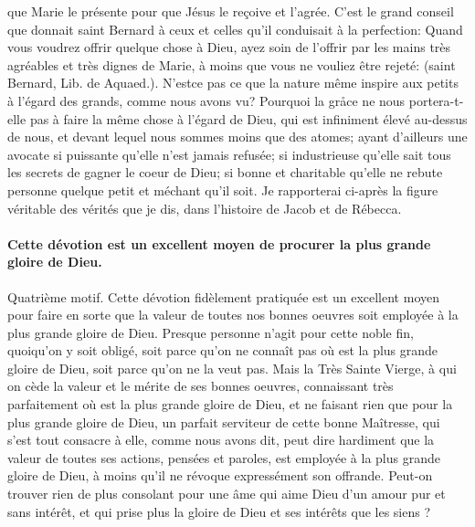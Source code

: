 que Marie le présente pour que Jésus le reçoive et l'agrée. C'est le grand conseil que donnait saint Bernard à ceux
et celles qu'il conduisait à la perfection: Quand vous voudrez offrir quelque chose à Dieu, ayez soin de l'offrir par
les mains très agréables et très dignes de Marie, à moins que vous ne vouliez être rejeté:  (saint Bernard, Lib. de
Aquaed.).
 N'estce pas ce que la nature même inspire aux petits à l'égard des grands, comme nous avons vu? Pourquoi
la gråce ne nous portera-t-elle pas à faire la même chose à l'égard de Dieu, qui est infiniment élevé au-dessus de
nous, et devant lequel nous sommes moins que des atomes; ayant d'ailleurs une avocate si puissante qu'elle n'est
jamais refusée; si industrieuse qu'elle sait tous les secrets de gagner le coeur de Dieu; si bonne et charitable
qu'elle ne rebute personne quelque petit et méchant qu'il soit. Je rapporterai ci-après la figure véritable des vérités
que je dis, dans l'histoire de Jacob et de Rébecca.
\paragraph{Cette dévotion est un excellent moyen de procurer la plus grande gloire de Dieu.}
 Quatrième motif. Cette dévotion fidèlement pratiquée est un excellent moyen pour faire en sorte que la valeur
de toutes nos bonnes oeuvres soit employée à la plus grande gloire de Dieu. Presque personne n'agit pour cette
noble fin, quoiqu'on y soit obligé, soit parce qu'on ne connaît pas où est la plus grande gloire de Dieu, soit parce
qu'on ne la veut pas. Mais la Très Sainte Vierge, à qui on cède la valeur et le mérite de ses bonnes oeuvres,
connaissant très parfaitement où est la plus grande gloire de Dieu, et ne faisant rien que pour la plus grande gloire
de Dieu, un parfait serviteur de cette bonne Maîtresse, qui s'est tout consacre à elle, comme nous avons dit, peut
dire hardiment que la valeur de toutes ses actions, pensées et paroles, est employée à la plus grande gloire de
Dieu, à moins qu'il ne révoque expressément son offrande. Peut-on trouver rien de plus consolant pour une âme
qui aime Dieu d'un amour pur et sans intérêt, et qui prise plus la gloire de Dieu et ses intérêts que les siens ?
